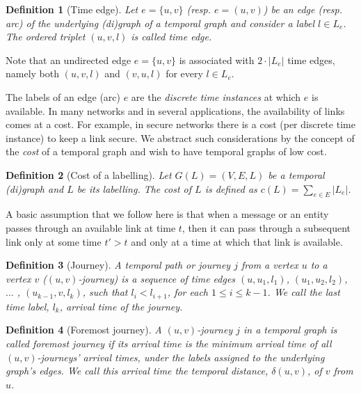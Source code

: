 \documentclass[a4paper,UKenglish]{article}
\newtheorem{definition}{Definition}
\begin{document}
\begin{definition}[Time edge]
Let $e=\{u,v\}$ (resp. $e=(u,v)$) be an edge (resp. arc) of the underlying (di)graph of a temporal graph and consider a label $l\in L_e$. The ordered triplet $(u,v,l)$ is called \emph{time edge}.
\end{definition}

Note that an undirected edge $e=\{u,v\}$ is associated with $2\cdot |L_e|$ time edges, namely both $(u,v,l)$ and $(v,u,l)$ for every $l\in L_e$.

The labels of an edge (arc) $e$ are the \emph{discrete time instances} at which $e$ is available. In many networks and in several applications, the availability of links comes at a cost. For example, in secure networks there is a cost (per discrete time instance) to keep a link secure. We abstract such considerations by the concept of the \emph{cost} of a temporal graph and wish to have temporal graphs of low cost.
\begin{definition}[Cost of a labelling]
Let $G(L)=(V,E,L)$ be a temporal (di)graph and $L$ be its labelling. The \emph{cost} of $L$ is defined as $c(L)= \sum_{e\in E} |L_e|$.
\end{definition}

A basic assumption that we follow here is that when a message or an entity passes through an available link at time $t$, then it can pass through a subsequent link only at some time $t'>t$ and only at a time at which that link is available. 
\begin{definition}[Journey]
A \emph{temporal path} or \emph{journey} $j$ from a vertex $u$ to a vertex $v$ {\emph ($(u, v)$-journey)} is a sequence of time edges $(u, u_1, l_1)$, $(u_1, u_2, l_2)$, $\ldots$ , $(u_{k-1}, v, l_k)$, such that $l_i < l_{i +1}$, for each $1 \leq i \leq k - 1$. We call the last time label, $l_k$, {\emph arrival time} of the journey.
\end{definition}
\begin{definition}[Foremost journey]
A $(u,v)$-journey $j$ in a temporal graph is called \emph{foremost journey} if its arrival time is the minimum arrival time of all $(u,v)$-journeys' arrival times, under the labels assigned to the underlying graph's edges. We call this arrival time the \emph{temporal distance}, $\delta(u,v)$, of $v$ from $u$.
\end{definition}
\end{document}

